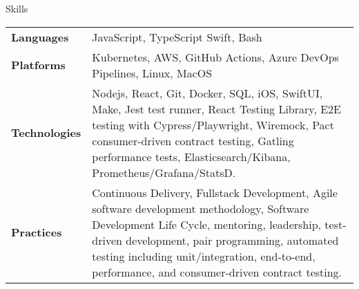 \begin{section}{Skills}
  \begin{tabularx}{\linewidth}{@{}l X@{}}
    \textbf{Languages} &\small{JavaScript, TypeScript Swift, Bash} \\
    \textbf{Platforms} &\small{Kubernetes, AWS, GitHub Actions, Azure DevOps Pipelines, Linux, MacOS} \\
    \textbf{Technologies} &\small{Nodejs, React, Git, Docker, SQL, iOS, SwiftUI, Make, Jest test runner, React Testing Library, E2E testing with Cypress/Playwright, Wiremock, Pact consumer-driven contract testing, Gatling performance tests, Elasticsearch/Kibana, Prometheus/Grafana/StatsD.} \\
    \textbf{Practices} &\small{Continuous Delivery, Fullstack Development, Agile software development methodology, Software Development Life Cycle, mentoring, leadership, test-driven development, pair programming, automated testing including unit/integration, end-to-end, performance, and consumer-driven contract testing.} \\
  \end{tabularx}
\end{section}
